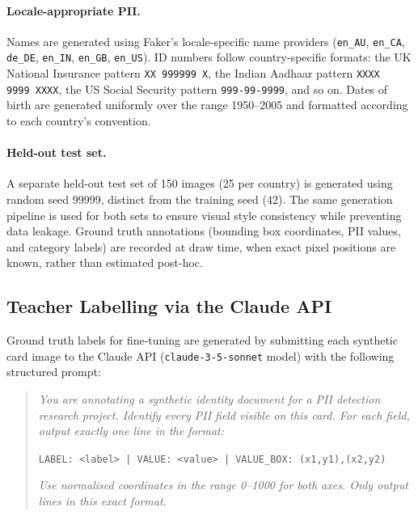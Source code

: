 \documentclass[conference]{IEEEtran}
\begin{document}
\paragraph{Locale-appropriate PII.}
Names are generated using Faker's locale-specific
name providers
(\texttt{en\_AU}, \texttt{en\_CA}, \texttt{de\_DE},
\texttt{en\_IN}, \texttt{en\_GB}, \texttt{en\_US}).
ID numbers follow country-specific formats: the UK
National Insurance pattern \texttt{XX\,999999\,X},
the Indian Aadhaar pattern \texttt{XXXX\,9999\,XXXX},
the US Social Security pattern \texttt{999-99-9999},
and so on.
Dates of birth are generated uniformly over the range
1950--2005 and formatted according to each country's
convention.

\paragraph{Held-out test set.}
A separate held-out test set of 150 images (25 per
country) is generated using random seed 99999,
distinct from the training seed (42).
The same generation pipeline is used for both sets
to ensure visual style consistency while preventing
data leakage.
Ground truth annotations (bounding box coordinates,
PII values, and category labels) are recorded at
draw time, when exact pixel positions are known,
rather than estimated post-hoc.

\subsection{Teacher Labelling via the Claude API}

Ground truth labels for fine-tuning are generated by
submitting each synthetic card image to the Claude API
(\texttt{claude-3-5-sonnet} model) with the following
structured prompt:

\begin{quote}
\small
\textit{You are annotating a synthetic identity document
for a PII detection research project.
Identify every PII field visible on this card.
For each field, output exactly one line in the format:}

\texttt{LABEL: <label> | VALUE: <value> |
VALUE\_BOX: (x1,y1),(x2,y2)}

\textit{Use normalised coordinates in the range
0--1000 for both axes.
Only output lines in this exact format.}
\end{quote}
\end{document}
